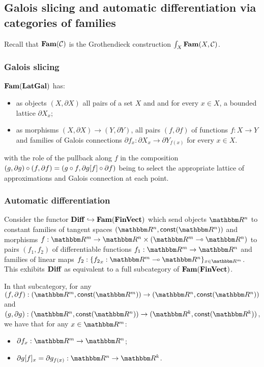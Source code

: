 \subsection{Galois slicing and automatic differentiation via categories of families}
\label{sec:galois-slicing-auto-diff-via-fam}

Recall that $\mathbf{Fam}(\mathcal{C})$ is the Grothendieck construction $\int_{X}\mathbf{Fam}(X, \mathcal{C})$.

\subsubsection{Galois slicing}
\label{sec:galois-slicing-auto-diff-via-fam:galois-slicing}

$\mathbf{Fam}(\mathbf{LatGal})$ has:
\begin{itemize}
\item as objects $(X, \partial X)$ all pairs of a set $X$ and and for every $x \in X$, a bounded lattice
$\partial X_x$;
\item as morphisms $(X, \partial X) \to (Y, \partial Y)$, all pairs $(f, \partial f)$ of functions $f: X \to
Y$ and families of Galois connections $\partial f_x: \partial X_x \to \partial Y_{f(x)}$ for every $x \in X$.
\end{itemize}

\noindent with the role of the pullback along $f$ in the composition $(g, \partial g) \circ (f, \partial f) =
(g \circ f, \partial g[f] \circ \partial f)$ being to select the appropriate lattice of
approximations and Galois connection at each point.


\subsubsection{Automatic differentiation}
\label{sec:galois-slicing-auto-diff-via-fam:auto-diff}

Consider the functor $\mathbf{Diff} \hookrightarrow \mathbf{Fam}(\mathbf{FinVect})$ which send objects $\RR^n$ to constant families of
tangent spaces $(\RR^n, \const(\RR^n))$ and morphisms $f: \RR^m \to \RR^n \times (\RR^m \linearto \RR^n)$ to
pairs $(f_1, f_2)$ of differentiable functions $f_1: \RR^m \to \RR^n$ and families of linear maps $f_2:
\{{f_2}_x: \RR^m \linearto \RR^n\}_{x \in \RR^m}$. This exhibits $\mathbf{Diff}$ as equivalent to a full subcategory
of $\mathbf{Fam}(\mathbf{FinVect})$.

In that subcategory, for any $(f, \partial f): (\RR^m, \const(\RR^m)) \to (\RR^n, \const(\RR^n))$ and $(g,
\partial g): (\RR^n, \const(\RR^n)) \to (\RR^k, \const(\RR^k))$, we have that for any $x \in \RR^m$:
\begin{itemize}
\item $\partial f_x: \RR^m \to \RR^n$;
\item $\reindex{\partial g}{f}_x = \partial g_{f(x)}: \RR^n \to \RR^k$.
\end{itemize}

